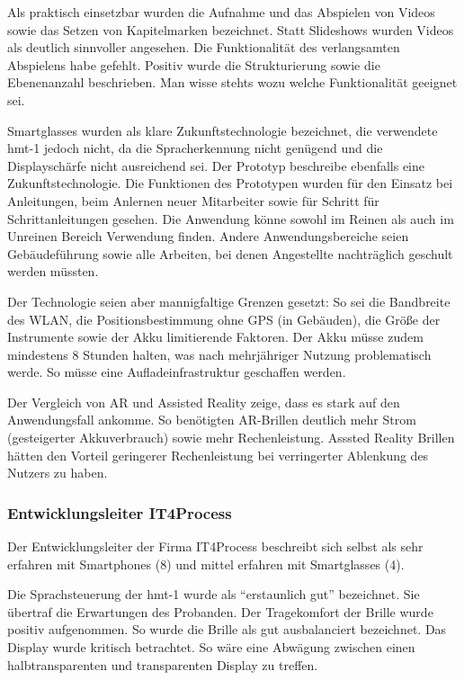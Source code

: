 Als praktisch einsetzbar wurden die Aufnahme und das Abspielen von Videos sowie das Setzen von Kapitelmarken bezeichnet. Statt Slideshows wurden Videos als deutlich sinnvoller angesehen. Die Funktionalität des verlangsamten Abspielens habe gefehlt. Positiv wurde die Strukturierung sowie die Ebenenanzahl beschrieben. Man wisse stehts wozu welche Funktionalität geeignet sei.

Smartglasses wurden als klare Zukunftstechnologie bezeichnet, die verwendete hmt-1 jedoch nicht, da die Spracherkennung nicht genügend und die Displayschärfe nicht ausreichend sei. Der Prototyp beschreibe ebenfalls eine Zukunftstechnologie. Die Funktionen des Prototypen wurden für den Einsatz bei Anleitungen, beim Anlernen neuer Mitarbeiter sowie für Schritt für Schrittanleitungen gesehen. Die Anwendung könne sowohl im Reinen als auch im Unreinen Bereich Verwendung finden. Andere Anwendungsbereiche seien Gebäudeführung sowie alle Arbeiten, bei denen Angestellte nachträglich geschult werden müssten. 

Der Technologie seien aber mannigfaltige Grenzen gesetzt: So sei die Bandbreite des WLAN, die Positionsbestimmung ohne GPS (in Gebäuden), die Größe der Instrumente sowie der Akku limitierende Faktoren. Der Akku müsse zudem mindestens 8 Stunden halten, was nach mehrjähriger Nutzung problematisch werde. So müsse eine Aufladeinfrastruktur geschaffen werden.

Der Vergleich von AR und Assisted Reality zeige, dass es stark auf den Anwendungsfall ankomme. So benötigten AR-Brillen deutlich mehr Strom (gesteigerter Akkuverbrauch) sowie mehr Rechenleistung. Asssted Reality Brillen hätten den Vorteil geringerer Rechenleistung bei verringerter Ablenkung des Nutzers zu haben.
%
%
\subsubsection{Entwicklungsleiter IT4Process}
Der Entwicklungsleiter der Firma IT4Process beschreibt sich selbst als sehr erfahren mit Smartphones (8) und mittel erfahren mit Smartglasses (4).

Die Sprachsteuerung der hmt-1 wurde als \enquote{erstaunlich gut} bezeichnet. Sie übertraf die Erwartungen des Probanden. Der Tragekomfort der Brille wurde positiv aufgenommen. So wurde die Brille als gut ausbalanciert bezeichnet. Das Display wurde kritisch betrachtet. So wäre eine Abwägung zwischen einen halbtransparenten und transparenten Display zu treffen. 

